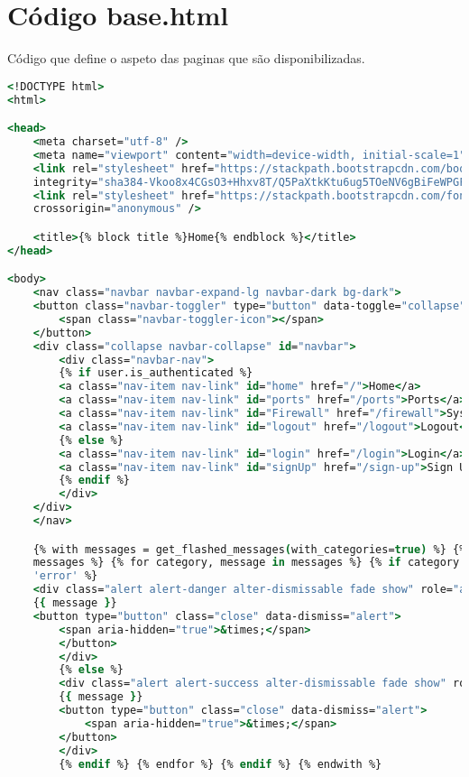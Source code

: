 
\chapter{Código base.html}
\label{chap:ze}

Código que define o aspeto das paginas que são disponibilizadas.


\begin{lstlisting}[language=csh, caption={Ficheiro base.html}]
<!DOCTYPE html>
<html>

<head>
    <meta charset="utf-8" />
    <meta name="viewport" content="width=device-width, initial-scale=1" />
    <link rel="stylesheet" href="https://stackpath.bootstrapcdn.com/bootstrap/4.4.1/css/bootstrap.min.css"
    integrity="sha384-Vkoo8x4CGsO3+Hhxv8T/Q5PaXtkKtu6ug5TOeNV6gBiFeWPGFN9MuhOf23Q9Ifjh" crossorigin="anonymous" />
    <link rel="stylesheet" href="https://stackpath.bootstrapcdn.com/font-awesome/4.7.0/css/font-awesome.min.css"
    crossorigin="anonymous" />

    <title>{% block title %}Home{% endblock %}</title>
</head>

<body>
    <nav class="navbar navbar-expand-lg navbar-dark bg-dark">
    <button class="navbar-toggler" type="button" data-toggle="collapse" data-target="#navbar">
        <span class="navbar-toggler-icon"></span>
    </button>
    <div class="collapse navbar-collapse" id="navbar">
        <div class="navbar-nav">
        {% if user.is_authenticated %}
        <a class="nav-item nav-link" id="home" href="/">Home</a>
        <a class="nav-item nav-link" id="ports" href="/ports">Ports</a>
        <a class="nav-item nav-link" id="Firewall" href="/firewall">System Firewall</a>
        <a class="nav-item nav-link" id="logout" href="/logout">Logout</a>
        {% else %}
        <a class="nav-item nav-link" id="login" href="/login">Login</a>
        <a class="nav-item nav-link" id="signUp" href="/sign-up">Sign Up</a>
        {% endif %}
        </div>
    </div>
    </nav>

    {% with messages = get_flashed_messages(with_categories=true) %} {% if
    messages %} {% for category, message in messages %} {% if category ==
    'error' %}
    <div class="alert alert-danger alter-dismissable fade show" role="alert">
    {{ message }}
    <button type="button" class="close" data-dismiss="alert">
        <span aria-hidden="true">&times;</span>
        </button>
        </div>
        {% else %}
        <div class="alert alert-success alter-dismissable fade show" role="alert">
        {{ message }}
        <button type="button" class="close" data-dismiss="alert">
            <span aria-hidden="true">&times;</span>
        </button>
        </div>
        {% endif %} {% endfor %} {% endif %} {% endwith %}
    

\end{lstlisting}
